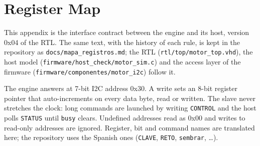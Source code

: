 \sloppy

\chapter{Register Map}
\label{app:regs}

This appendix is the interface contract between the engine and its host,
version 0x04 of the \ac{RTL}. The same text, with the history of each
rule, is kept in the repository as \nolinkurl{docs/mapa_registros.md}; the
\ac{RTL} (\nolinkurl{rtl/top/motor_top.vhd}), the host model
(\nolinkurl{firmware/host_check/motor_sim.c}) and the access layer of the
firmware (\nolinkurl{firmware/componentes/motor_i2c}) follow it.

The engine answers at 7-bit \ac{I2C} address 0x30. A write sets an 8-bit
register pointer that auto-increments on every data byte, read or
written. The slave never stretches the clock: long commands are launched
by writing \texttt{CONTROL} and the host polls \texttt{STATUS} until
\texttt{busy} clears. Undefined addresses read as 0x00 and writes to
read-only addresses are ignored. Register, bit and command names are
translated here; the repository uses the Spanish ones
(\texttt{CLAVE}, \texttt{RETO}, \texttt{sembrar}, \ldots).

